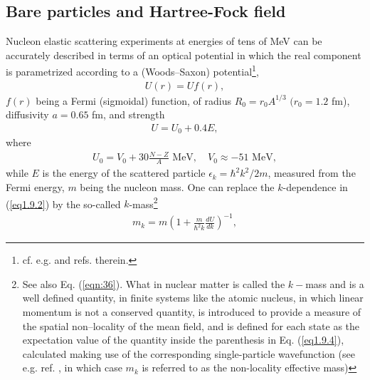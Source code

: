 \subsection{Bare particles and Hartree-Fock field}\label{S1.9.1}
Nucleon elastic scattering experiments at energies of tens of MeV can be accurately described in terms of an optical potential in which the real component is parametrized according to a (Woods--Saxon) potential\footnote{cf. e.g. \cite{Bohr:69} and refs. therein.},
\begin{align}
U(r)=Uf(r),
\end{align}
$f(r)$ being a Fermi (sigmoidal) function, of radius $R_0=r_0A^{1/3}$ $(r_0=1.2$ fm), diffusivity $a=0.65$ fm, and strength 
\begin{align}\label{eq1.9.2}
U=U_0+0.4 E,
\end{align}
where 
\begin{align}\label{eq1.9.3}
U_0=V_0+30\frac{N-Z}{A}\text{ MeV},\quad V_0\approx-51\text{ MeV},
\end{align}
while $E$ is the energy of the scattered particle $\epsilon_k=\hbar^2k^2/2m$, measured from the Fermi energy, $m$ being the nucleon mass. One can replace the $k$-dependence in (\ref{eq1.9.2}) by the so-called $k$-mass\footnote{See also Eq. (\ref{eqn:36}). What in nuclear matter is called the $k-$mass  and is a well defined quantity, in finite systems like the atomic nucleus, in which linear momentum is not
a conserved quantity,  is introduced to provide a measure of the spatial non--locality of the mean field, and is defined for each state 
as the expectation value of the quantity inside the parenthesis in Eq. (\ref{eq1.9.4}), calculated making use of the corresponding single-particle wavefunction 
(see e.g. ref. \cite{Bernard:81}, in which case $m_k$ is referred to as the non-locality effective mass)}
\begin{align}\label{eq1.9.4}
m_k=m\left(1+\frac{m}{\hbar^2k}\frac{dU}{dk}\right)^{-1},
\end{align}
